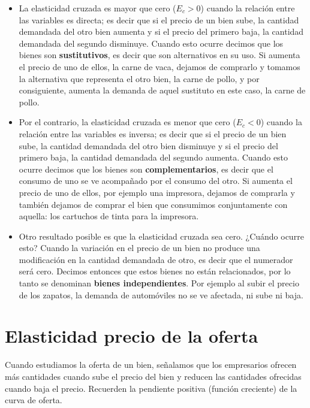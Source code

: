 \documentclass[12pt,a4paper]{article}
\begin{document}
\begin{itemize}
\item La elasticidad cruzada es mayor que cero ($E_c > 0$) cuando la relación entre las variables es directa; es decir que si el precio de un bien sube, la cantidad demandada del otro bien aumenta y si el precio del primero baja, la cantidad demandada del segundo disminuye. Cuando esto ocurre decimos que los bienes son \textbf{sustitutivos}, es decir que son alternativos en su uso. Si aumenta el precio de uno de ellos, la carne de vaca, dejamos de comprarlo y tomamos la alternativa que representa el otro bien, la carne de pollo, y por consiguiente, aumenta la demanda de aquel sustituto en este caso, la carne de pollo.

\item Por el contrario, la elasticidad cruzada es menor que cero ($E_c < 0$) cuando la relación entre las variables es inversa; es decir que si el precio de un bien sube, la cantidad demandada del otro bien disminuye y si el precio del primero baja, la cantidad demandada del segundo aumenta. Cuando esto ocurre decimos que los bienes son \textbf{complementarios}, es decir que el consumo de uno se ve acompañado por el consumo del otro. Si aumenta el precio de uno de ellos, por ejemplo una impresora, dejamos de comprarla y también dejamos de comprar el bien que consumimos conjuntamente con aquella: los cartuchos de tinta para la impresora.

\item Otro resultado posible es que la elasticidad cruzada sea cero. ¿Cuándo ocurre esto? Cuando la variación en el precio de un bien no produce una modificación en la cantidad demandada de otro, es decir que el numerador será cero. Decimos entonces que estos bienes no están relacionados, por lo tanto se denominan \textbf{bienes independientes}. Por ejemplo al subir el precio de los zapatos, la demanda de automóviles no se ve afectada, ni sube ni baja.
\end{itemize}

\section{Elasticidad precio de la oferta}

Cuando estudiamos la oferta de un bien, señalamos que los empresarios ofrecen más cantidades cuando sube el precio del bien y reducen las cantidades ofrecidas cuando baja el precio. Recuerden la pendiente positiva (función creciente) de la curva de oferta.
\end{document}
